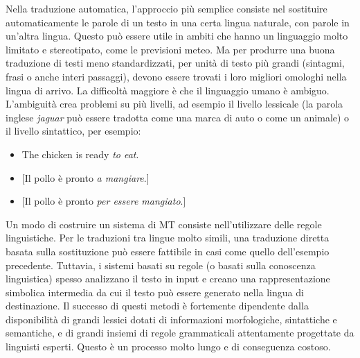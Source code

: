 \documentclass[]{../../metanetpaper}
\begin{document}
\begin{multicols}{2}


Nella traduzione automatica, l'approccio pi\`{u} semplice consiste nel sostituire automaticamente le parole di un testo in una certa lingua naturale, con parole in un'altra lingua. Questo pu\`{o} essere utile in ambiti che hanno un linguaggio molto limitato e stereotipato, come le previsioni meteo. Ma per produrre una buona traduzione di testi meno standardizzati, per unit\`{a} di testo pi\`{u} grandi (sintagmi, frasi o anche interi passaggi), devono essere trovati i loro migliori omologhi nella lingua di arrivo. La difficolt\`{a} maggiore \`{e} che il linguaggio umano \`{e} ambiguo. L'ambiguit\`{a} crea problemi su pi\`{u} livelli, ad esempio il livello lessicale (la parola inglese \emph{jaguar} pu\`{o} essere tradotta come una marca di auto o come un animale) o il livello sintattico, per esempio:



\begin{itemize}
\item The chicken is ready \emph{to eat}.
\item {[}Il pollo  \`{e} pronto \emph{a mangiare}.{]}
\item {[}Il pollo  \`{e} pronto \emph{per essere mangiato}.{]}
\end{itemize}

Un modo di costruire un sistema di MT consiste nell'utilizzare delle regole linguistiche. Per le traduzioni tra lingue molto simili, una traduzione diretta basata sulla sostituzione pu\`{o} essere fattibile in casi come quello dell'esempio precedente. Tuttavia, i sistemi basati su regole (o basati sulla conoscenza linguistica) spesso analizzano il testo in input e creano una rappresentazione simbolica intermedia da cui il testo pu\`{o} essere generato nella lingua di destinazione. Il successo di questi metodi \`{e} fortemente dipendente dalla disponibilit\`{a} di grandi lessici dotati di informazioni morfologiche, sintattiche e semantiche, e di grandi insiemi di regole grammaticali attentamente progettate da linguisti esperti. Questo \`{e} un processo molto lungo e di conseguenza costoso.


\end{multicols}
\end{document}

